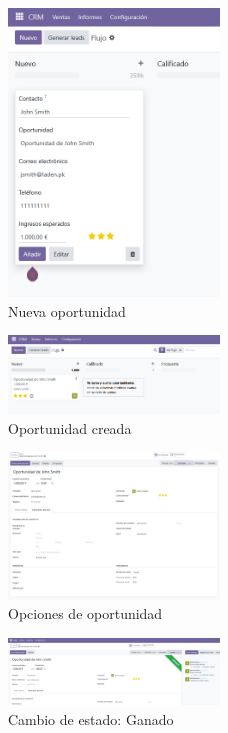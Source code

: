 \documentclass[a4paper,12pt]{article}
\begin{document}
\begin{figure}[h!]
    \centering
    \includegraphics[width=0.5\textwidth]{pr2odoo67-nuevaOportunidad.png}
    \caption{Nueva oportunidad}
\end{figure}
\FloatBarrier

\begin{figure}[h!]
    \centering
    \includegraphics[width=0.5\textwidth]{pr2odoo68-oportunidadCreada.png}
    \caption{Oportunidad creada}
\end{figure}
\FloatBarrier

\begin{figure}[h!]
    \centering
    \includegraphics[width=0.5\textwidth]{pr2odoo69-oportunidadOpciones.png}
    \caption{Opciones de oportunidad}
\end{figure}
\FloatBarrier

\begin{figure}[h!]
    \centering
    \includegraphics[width=0.5\textwidth]{pr2odoo70-oportunidadGanado.png}
    \caption{Cambio de estado: Ganado}
\end{figure}
\FloatBarrier
\end{document}
